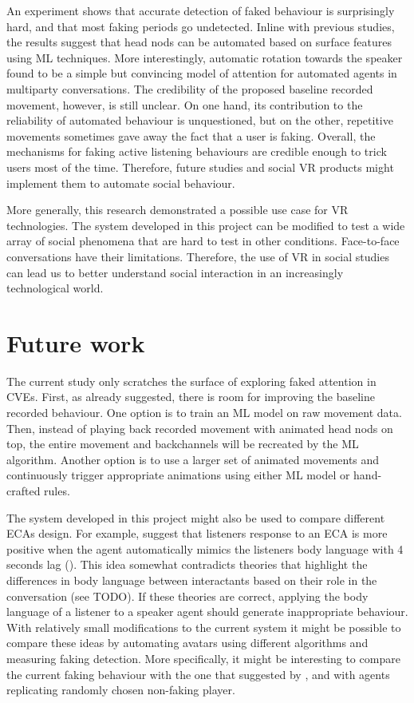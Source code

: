 \documentclass[]{simple-thesis}
\begin{document}
An experiment shows that accurate detection of faked behaviour is surprisingly hard, and that most faking periods go undetected.
Inline with previous studies, the results suggest that head nods can be automated based on surface features using ML techniques.
More interestingly, automatic rotation towards the speaker found to be a simple but convincing model of attention for automated agents in multiparty conversations.
The credibility of the proposed baseline recorded movement, however, is still unclear.
On one hand, its contribution to the reliability of automated behaviour is unquestioned, but on the other, repetitive movements sometimes gave away the fact that a user is faking.
Overall, the mechanisms for faking active listening behaviours are credible enough to trick users most of the time.
Therefore, future studies and social VR products might implement them to automate social behaviour.

More generally, this research demonstrated a possible use case for VR technologies.
The system developed in this project can be modified to test a wide array of social phenomena that are hard to test in other conditions.
Face-to-face conversations have their limitations.
Therefore, the use of VR in social studies can lead us to better understand social interaction in an increasingly technological world.

\section{Future work}

The current study only scratches the surface of exploring faked attention in CVEs.
First, as already suggested, there is room for improving the baseline recorded behaviour.
One option is to train an ML model on raw movement data.
Then, instead of playing back recorded movement with animated head nods on top, the entire movement and backchannels will be recreated by the ML algorithm.
Another option is to use a larger set of animated movements and continuously trigger appropriate animations using either ML model or hand-crafted rules.

The system developed in this project might also be used to compare different ECAs design.
For example, \citeauthor{Bailenson2005} suggest that listeners response to an ECA is more positive when the agent automatically mimics the listeners body language with 4 seconds lag (\citeyear{Bailenson2005}).
This idea somewhat contradicts theories that highlight the differences in body language between interactants based on their role in the conversation (see TODO).
If these theories are correct, applying the body language of a listener to a speaker agent should generate inappropriate behaviour.
With relatively small modifications to the current system it might be possible to compare these ideas by automating avatars using different algorithms and measuring faking detection.
More specifically, it might be interesting to compare the current faking behaviour with the one that suggested by \citeauthor{Bailenson2005}, and with agents replicating randomly chosen non-faking player.
\end{document}

